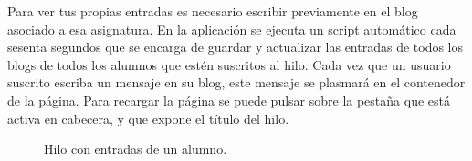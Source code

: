 \documentclass[a4paper, 12pt]{book}
\begin{document}
Para ver tus propias entradas es necesario escribir previamente en el blog asociado a esa asignatura. En la aplicaci\'on se ejecuta un script 
autom\'atico cada sesenta segundos que se encarga de guardar y actualizar las entradas de todos los blogs de todos los alumnos que est\'en suscritos al 
hilo. Cada vez que un usuario suscrito escriba un mensaje en su blog, este mensaje se plasmar\'a en el contenedor de la p\'agina. Para recargar la p\'agina 
se puede pulsar sobre la pesta\~na que est\'a activa en cabecera, y que expone el t\'itulo del hilo.
\begin{figure}[htbp] 
  \centering
  \caption{Hilo con entradas de un alumno.}
  \label{figura:hiloalumno1}
\end{figure}
\end{document}

